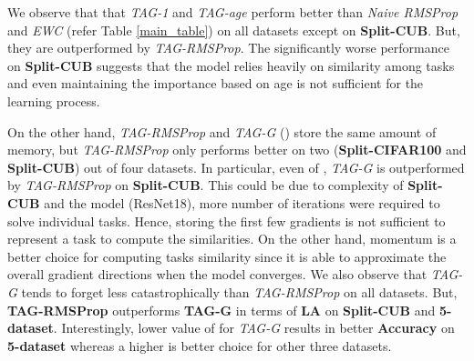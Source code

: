\documentclass{article} \usepackage{collas2022_conference,times}
\begin{document}
{We observe that that \textit{TAG-1} and \textit{TAG-age} perform better than \textit{Naive RMSProp} and \textit{EWC} (refer Table \ref{main_table}) on all datasets except on \textbf{Split-CUB}. But, they are outperformed by \textit{TAG-RMSProp}. The significantly worse performance on \textbf{Split-CUB} suggests that the model relies heavily on similarity among tasks and even maintaining the importance based on age is not sufficient for the learning process. 

On the other hand, \textit{TAG-RMSProp} and \textit{TAG-G} () store the same amount of memory, but \textit{TAG-RMSProp} only performs better on two (\textbf{Split-CIFAR100} and \textbf{Split-CUB}) out of four datasets. In particular, even of , \textit{TAG-G} is outperformed by \textit{TAG-RMSProp} on \textbf{Split-CUB}. This could be due to complexity of \textbf{Split-CUB} and the model (ResNet18), more number of iterations were required to solve individual tasks. Hence, storing the first few gradients is not sufficient to represent a task to compute the similarities. On the other hand, momentum is a better choice for computing tasks similarity since it is able to approximate the overall gradient directions when the model converges. We also observe that \textit{TAG-G} tends to forget less catastrophically than \textit{TAG-RMSProp} on all datasets. But, \textbf{TAG-RMSProp} outperforms \textbf{TAG-G} in terms of \textbf{LA} on \textbf{Split-CUB} and \textbf{5-dataset}. Interestingly, lower value of  for \textit{TAG-G} results in better \textbf{Accuracy} on \textbf{5-dataset} whereas a higher  is better choice for other three datasets. 

}
\end{document}
